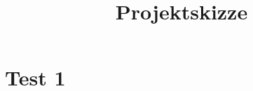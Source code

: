 \documentclass[11pt, a4paper]{report}
\title{Projektskizze}
\begin{document}
\frontmatter
\tableofcontents\thispagestyle{plain}
\newpage
\listoffigures\thispagestyle{plain}
\newpage
\listoftables\thispagestyle{plain}
\mainmatter
\chapter{Test 1}
\label{cha:test_1}
    \blindtext
    \newpage
    \blindtext
\Blinddocument
\Blinddocument
\Blinddocument
\Blinddocument
\Blinddocument
\Blinddocument
\Blinddocument
\Blinddocument
\Blinddocument
\end{document}
